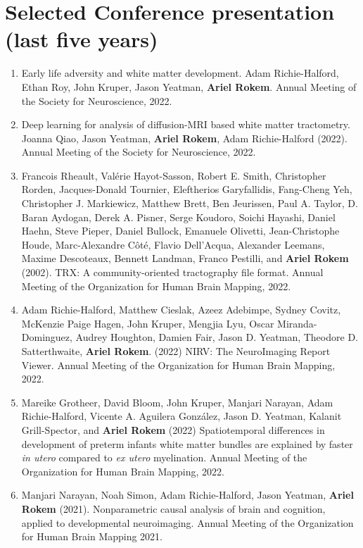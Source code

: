 \documentclass[11pt,fullpage]{article}
\begin{document}
\section*{Selected Conference presentation (last five years)}
\begin{enumerate}

\item Early life adversity and white matter development. Adam Richie-Halford, Ethan Roy, John Kruper, Jason Yeatman, {\bf Ariel Rokem}. Annual Meeting of the Society for Neuroscience, 2022.

\item Deep learning for analysis of diffusion-MRI based white matter tractometry. Joanna Qiao, Jason Yeatman, {\bf Ariel Rokem}, Adam Richie-Halford (2022). Annual Meeting of the Society for Neuroscience, 2022.

\item Francois Rheault, Val\'{e}rie Hayot-Sasson, Robert E. Smith, Christopher Rorden, Jacques-Donald Tournier, Eleftherios Garyfallidis, Fang-Cheng Yeh, Christopher J. Markiewicz, Matthew Brett, Ben Jeurissen, Paul A. Taylor, D. Baran Aydogan, Derek A. Pisner, Serge Koudoro, Soichi Hayashi, Daniel Haehn, Steve Pieper, Daniel Bullock, Emanuele Olivetti, Jean-Christophe Houde, Marc-Alexandre C\^{o}t\'{e}, Flavio Dell’Acqua, Alexander Leemans, Maxime Descoteaux, Bennett Landman, Franco Pestilli, and {\bf Ariel Rokem} (2002). TRX: A community-oriented tractography file format. Annual Meeting of the Organization for Human Brain Mapping, 2022.

\item Adam Richie-Halford, Matthew Cieslak, Azeez Adebimpe, Sydney Covitz, McKenzie Paige Hagen, John Kruper, Mengjia Lyu, Oscar Miranda-Dominguez, Audrey Houghton, Damien Fair, Jason D. Yeatman, Theodore D. Satterthwaite, {\bf Ariel Rokem}. (2022) NIRV: The NeuroImaging Report Viewer. Annual Meeting of the Organization for Human Brain Mapping, 2022.

\item Mareike Grotheer, David Bloom, John Kruper, Manjari Narayan, Adam Richie-Halford, Vicente A. Aguilera González, Jason D. Yeatman, Kalanit Grill-Spector, and {\bf Ariel Rokem} (2022) Spatiotemporal differences in development of preterm infants white matter bundles are explained by faster \emph{in utero} compared to \emph{ex utero} myelination. Annual Meeting of the Organization for Human Brain Mapping, 2022.

\item Manjari Narayan, Noah Simon, Adam Richie-Halford, Jason Yeatman, {\bf Ariel Rokem} (2021). Nonparametric causal analysis of brain and cognition, applied to developmental neuroimaging. Annual Meeting of the Organization for Human Brain Mapping 2021.


\end{enumerate}
\end{document}
